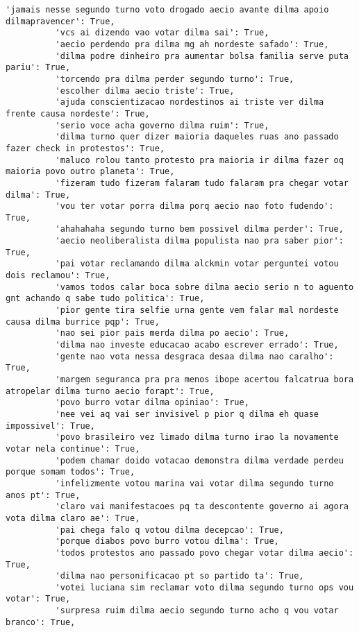 \documentclass[11pt]{article}
\begin{document}
\begin{Verbatim}[commandchars=\\\{\}]
          'jamais nesse segundo turno voto drogado aecio avante dilma apoio dilmapravencer': True,
          'vcs ai dizendo vao votar dilma sai': True,
          'aecio perdendo pra dilma mg ah nordeste safado': True,
          'dilma podre dinheiro pra aumentar bolsa familia serve puta pariu': True,
          'torcendo pra dilma perder segundo turno': True,
          'escolher dilma aecio triste': True,
          'ajuda conscientizacao nordestinos ai triste ver dilma frente causa nordeste': True,
          'serio voce acha governo dilma ruim': True,
          'dilma turno quer dizer maioria daqueles ruas ano passado fazer check in protestos': True,
          'maluco rolou tanto protesto pra maioria ir dilma fazer oq maioria povo outro planeta': True,
          'fizeram tudo fizeram falaram tudo falaram pra chegar votar dilma': True,
          'vou ter votar porra dilma porq aecio nao foto fudendo': True,
          'ahahahaha segundo turno bem possivel dilma perder': True,
          'aecio neoliberalista dilma populista nao pra saber pior': True,
          'pai votar reclamando dilma alckmin votar perguntei votou dois reclamou': True,
          'vamos todos calar boca sobre dilma aecio serio n to aguento gnt achando q sabe tudo politica': True,
          'pior gente tira selfie urna gente vem falar mal nordeste causa dilma burrice pqp': True,
          'nao sei pior pais merda dilma po aecio': True,
          'dilma nao investe educacao acabo escrever errado': True,
          'gente nao vota nessa desgraca desaa dilma nao caralho': True,
          'margem seguranca pra pra menos ibope acertou falcatrua bora atropelar dilma turno aecio forapt': True,
          'povo burro votar dilma opiniao': True,
          'nee vei aq vai ser invisivel p pior q dilma eh quase impossivel': True,
          'povo brasileiro vez limado dilma turno irao la novamente votar nela continue': True,
          'podem chamar doido votacao demonstra dilma verdade perdeu porque somam todos': True,
          'infelizmente votou marina vai votar dilma segundo turno anos pt': True,
          'claro vai manifestacoes pq ta descontente governo ai agora vota dilma claro ae': True,
          'pai chega falo q votou dilma decepcao': True,
          'porque diabos povo burro votou dilma': True,
          'todos protestos ano passado povo chegar votar dilma aecio': True,
          'dilma nao personificacao pt so partido ta': True,
          'votei luciana sim reclamar voto dilma segundo turno ops vou votar': True,
          'surpresa ruim dilma aecio segundo turno acho q vou votar branco': True,

\end{Verbatim}
\end{document}
